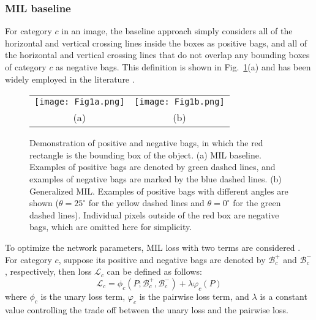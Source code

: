 \documentclass[runningheads]{llncs}
\begin{document}
\subsubsection{MIL baseline} 
\label{section:baseline_baseline}
For category $c$ in an image, the baseline approach simply considers all of the horizontal and vertical crossing lines inside the boxes as positive bags, and all of the horizontal and vertical crossing lines that do not overlap any bounding boxes of category $c$ as negative bags. This definition is shown in Fig.~\ref{fig:mil_demonstration}(a) and has been widely employed in the literature \cite{hsu2019weakly,kervadec2020bounding}.

\begin{figure}[htbp] 
	\centering
	\setlength{\tabcolsep}{2pt}
	\begin{tabular}{cc}
	\texttt{[image: Fig1a.png]} &
	\texttt{[image: Fig1b.png]} \\ 
	(a)&(b) \\
	\end{tabular}
	\caption{Demonstration of positive and negative bags, in which the red rectangle is the bounding box of the object. (a) MIL baseline. Examples of positive bags are denoted by green dashed lines, and examples of negative bags are marked by the blue dashed lines. (b) Generalized MIL. Examples of positive bags with different angles are shown ($\theta=25^\circ$ for the yellow dashed lines and $\theta=0^\circ$ for the green dashed lines). Individual pixels outside of the red box are negative bags, which are omitted here for simplicity. }
	\label{fig:mil_demonstration}
\end{figure}

To optimize the network parameters, MIL loss with two terms are considered \cite{hsu2019weakly}. For category $c$, suppose its positive and negative bags are denoted by $\mathcal{B}_c^+$ and $\mathcal{B}_c^-$, respectively, then loss $\mathcal{L}_c$ can be defined as follows:
\begin{equation}
\mathcal{L}_c = \phi_c(P; \mathcal{B}_c^+, \mathcal{B}_c^-) + \lambda \varphi_c(P)
\label{equ:mil_loss}
\end{equation}
where $\phi_c$ is the unary loss term, $\varphi_c$ is the pairwise loss term, and $\lambda$ is a constant value controlling the trade off between the unary loss and the pairwise loss.
\end{document}
